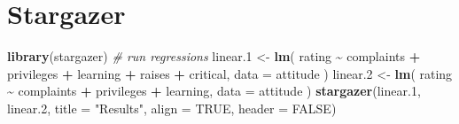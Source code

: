 \documentclass[
]{article}
\newenvironment{Shaded}{\begin{snugshade}}{\end{snugshade}}
\newcommand{\AttributeTok}[1]{\textcolor[rgb]{0.13,0.29,0.53}{#1}}
\newcommand{\CommentTok}[1]{\textcolor[rgb]{0.56,0.35,0.01}{\textit{#1}}}
\newcommand{\ConstantTok}[1]{\textcolor[rgb]{0.56,0.35,0.01}{#1}}
\newcommand{\FloatTok}[1]{\textcolor[rgb]{0.00,0.00,0.81}{#1}}
\newcommand{\FunctionTok}[1]{\textcolor[rgb]{0.13,0.29,0.53}{\textbf{#1}}}
\newcommand{\NormalTok}[1]{#1}
\newcommand{\OtherTok}[1]{\textcolor[rgb]{0.56,0.35,0.01}{#1}}
\newcommand{\SpecialCharTok}[1]{\textcolor[rgb]{0.81,0.36,0.00}{\textbf{#1}}}
\newcommand{\StringTok}[1]{\textcolor[rgb]{0.31,0.60,0.02}{#1}}
\begin{document}
\vspace{10mm}

\section{Stargazer}\label{stargazer}

\begin{Shaded}
\begin{Highlighting}[]
\FunctionTok{library}\NormalTok{(stargazer)}
\CommentTok{\# run regressions}
\NormalTok{linear}\FloatTok{.1} \OtherTok{\textless{}{-}} \FunctionTok{lm}\NormalTok{(}
\NormalTok{  rating }\SpecialCharTok{\textasciitilde{}}\NormalTok{ complaints }\SpecialCharTok{+}\NormalTok{ privileges }\SpecialCharTok{+}\NormalTok{ learning }\SpecialCharTok{+}\NormalTok{ raises }\SpecialCharTok{+}\NormalTok{ critical,}
  \AttributeTok{data =}\NormalTok{ attitude}
\NormalTok{)}
\NormalTok{linear}\FloatTok{.2} \OtherTok{\textless{}{-}} \FunctionTok{lm}\NormalTok{(}
\NormalTok{  rating }\SpecialCharTok{\textasciitilde{}}\NormalTok{ complaints }\SpecialCharTok{+}\NormalTok{ privileges }\SpecialCharTok{+}\NormalTok{ learning, }\AttributeTok{data =}\NormalTok{ attitude}
\NormalTok{)}
\FunctionTok{stargazer}\NormalTok{(linear}\FloatTok{.1}\NormalTok{, linear}\FloatTok{.2}\NormalTok{, }\AttributeTok{title =} \StringTok{"Results"}\NormalTok{, }\AttributeTok{align =} \ConstantTok{TRUE}\NormalTok{, }\AttributeTok{header =} \ConstantTok{FALSE}\NormalTok{)}
\end{Highlighting}
\end{Shaded}
\end{document}
